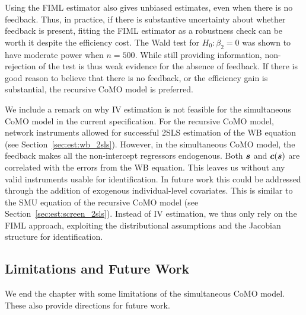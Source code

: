 Using the FIML estimator also gives unbiased estimates, even when there is no feedback. Thus, in practice, if there is substantive uncertainty about whether feedback is present, fitting the FIML estimator as a robustness check can be worth it despite the efficiency cost. The Wald test for $H_0: \beta_2 = 0$ was shown to have moderate power when $n = 500$. While still providing information, non-rejection of the test is thus weak evidence for the absence of feedback. If there is good reason to believe that there is no feedback, or the efficiency gain is substantial, the recursive CoMO model is preferred.

\begin{remark}
\label{rem:simul_no_iv}
We include a remark on why IV estimation is not feasible for the simultaneous CoMO model in the current specification. For the recursive CoMO model, network instruments allowed for successful 2SLS estimation of the WB equation (see Section~\ref{sec:est:wb_2sls}). However, in the simultaneous CoMO model, the feedback makes all the non-intercept regressors endogenous. Both $\bm{s}$ and $\bm{c}(\bm{s})$ are correlated with the errors from the WB equation. This leaves us without any valid instruments usable for identification. In future work this could be addressed through the addition of exogenous individual-level covariates. This is similar to the SMU equation of the recursive CoMO model (see Section~\ref{sec:est:screen_2sls}). Instead of IV estimation, we thus only rely on the FIML approach, exploiting the distributional assumptions and the Jacobian structure for identification.
\end{remark}

\subsection{Limitations and Future Work}
\label{sec:simul:future}
We end the chapter with some limitations of the simultaneous CoMO model. These also provide directions for future work.

